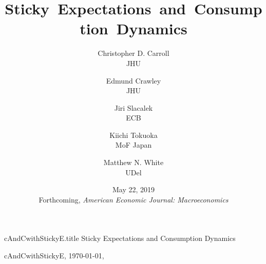 \documentclass[titlepage]{./econtex}
\begin{document}

\begin{adjustwidth}{-1em}{-1em}

\begin{verbatimwrite}{cAndCwithStickyE.title}
Sticky Expectations and Consumption Dynamics
\end{verbatimwrite}

\hfill{\tiny cAndCwithStickyE, \today, \currenttime}

\title{Sticky~Expectations~and~Consumption~Dynamics}

{
\author{
  Christopher D. Carroll\authNum \\ {\small JHU}
  \and
  Edmund Crawley\authNum   \\ {\small JHU}
  \and
  Jiri Slacalek\authNum    \\ {\small ECB}
  \and
  Kiichi Tokuoka\authNum   \\ {\small MoF Japan}
  \and
  Matthew N. White\authNum \\ {\small UDel}
}
} 



\date{May 22, 2019  \\ \medskip\medskip \large{Forthcoming, \textit{American Economic Journal: Macroeconomics}}}
\maketitle


\end{adjustwidth}
\end{document}
